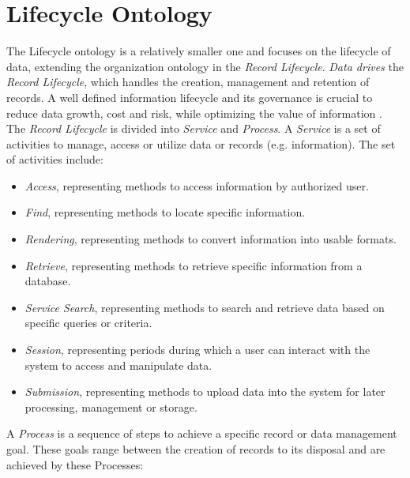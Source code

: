 \documentclass[
  a4paper,  %
  twoside,  %
  bibliography=totoc,
  headsepline,
  cleardoublepage=empty,
  parskip=half,
  draft=false
]{scrbook}
\begin{document}
\section{Lifecycle Ontology}

The Lifecycle ontology is a relatively smaller one and focuses on the lifecycle of data, extending the organization ontology in the \textit{Record Lifecycle}. \textit{Data drives} the \textit{Record Lifecycle}, which handles the creation, management and retention of records. A well defined information lifecycle and its governance is crucial to reduce data growth, cost and risk, while optimizing the value of information \cite{Lambrechts2014Information}. \\
The \textit{Record Lifecycle} is divided into \textit{Service} and \textit{Process}. A \textit{Service} is a set of activities to manage, access or utilize data or records (e.g. information). The set of activities include: 
\begin{itemize}
    \item \textit{Access}, representing methods to access information by authorized user.
    \item \textit{Find}, representing methods to locate specific information. 
    \item \textit{Rendering}, representing methods to convert information into usable formats.
    \item \textit{Retrieve}, representing methods to retrieve specific information from a database.
    \item \textit{Service Search}, representing methods to search and retrieve data based on specific queries or criteria.
    \item \textit{Session}, representing periods during which a user can interact with the system to access and manipulate data. 
    \item \textit{Submission}, representing methods to upload data into the system for later processing, management or storage.
\end{itemize}

A \textit{Process} is a sequence of steps to achieve a specific record or data management goal. These goals range between the creation of records to its disposal and are achieved by these Processes: 
\end{document}

